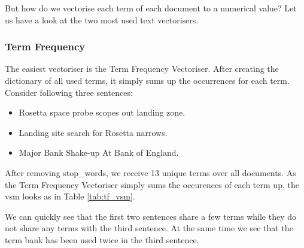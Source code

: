 But how do we vectorise each term of each document to a numerical value?
Let us have a look at the two most used text vectorisers.

\subsubsection{Term Frequency}
The easiest vectoriser is the Term Frequency Vectoriser.
After creating the dictionary of all used terms, it simply sums up the occurrences for each term.
Consider following three sentences:

\begin{itemize}
    \item Rosetta space probe scopes out landing zone.
    \item Landing site search for Rosetta narrows.
    \item Major Bank Shake-up At Bank of England.
\end{itemize}

After removing \Glspl{stop_word}, we receive 13 unique terms over all documents.
As the Term Frequency Vectoriser simply sums the occurences of each term up,
the \Gls{vsm} looks as in Table \ref{tab:tf_vsm}.

\begin{table}[h]
    \centering
    \caption{Term Frequency \Gls{vsm}.}
    \label{tab:tf_vsm}
\end{table}

We can quickly see that the first two sentences share a few terms while they do not share any terms with the third sentence.
At the same time we see that the term bank has been used twice in the third sentence.

